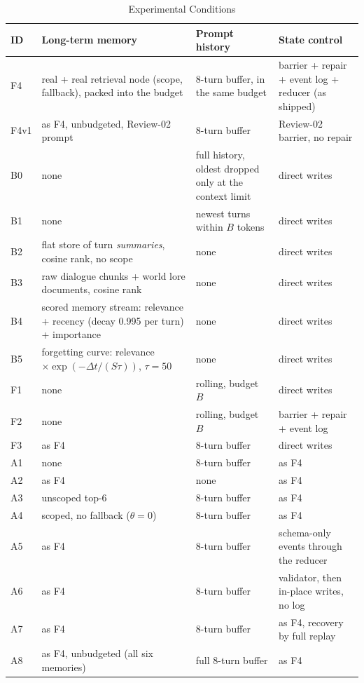 \documentclass[letterpaper,journal]{IEEEtran}
\begin{document}
\begin{table}[!btp]
\centering\footnotesize
\caption{Experimental Conditions}
\label{tab:conditions}
\begin{tabularx}{\linewidth}{@{}l L L L@{}}
\toprule
ID & Long-term memory & Prompt history & State control \\
\midrule
F4 & real  + real retrieval node (scope, fallback), packed into the budget & 8-turn buffer, in the same budget & barrier + repair + event log + reducer (as shipped) \\
F4v1 & as F4, unbudgeted, Review-02 prompt & 8-turn buffer & Review-02 barrier, no repair \\
B0 & none & full history, oldest dropped only at the context limit & direct writes \\
B1 & none & newest turns within $B$ tokens & direct writes \\
B2 & flat store of turn \emph{summaries}, cosine rank, no scope & none & direct writes \\
B3 & raw dialogue chunks + world lore documents, cosine rank & none & direct writes \\
B4 & scored memory stream: relevance + recency (decay 0.995 per turn) + importance & none & direct writes \\
B5 & forgetting curve: relevance $\times\exp(-\Delta t/(S\tau))$, $\tau=50$ & none & direct writes \\
\midrule
F1 & none & rolling, budget $B$ & direct writes \\
F2 & none & rolling, budget $B$ & barrier + repair + event log \\
F3 & as F4 & 8-turn buffer & direct writes \\
\midrule
A1 & none & 8-turn buffer & as F4 \\
A2 & as F4 & none & as F4 \\
A3 & unscoped top-6 & 8-turn buffer & as F4 \\
A4 & scoped, no fallback ($\theta=0$) & 8-turn buffer & as F4 \\
A5 & as F4 & 8-turn buffer & schema-only events through the reducer \\
A6 & as F4 & 8-turn buffer & validator, then in-place writes, no log \\
A7 & as F4 & 8-turn buffer & as F4, recovery by full replay \\
A8 & as F4, unbudgeted (all six memories) & full 8-turn buffer & as F4 \\
\bottomrule
\end{tabularx}
\end{table}
\end{document}
